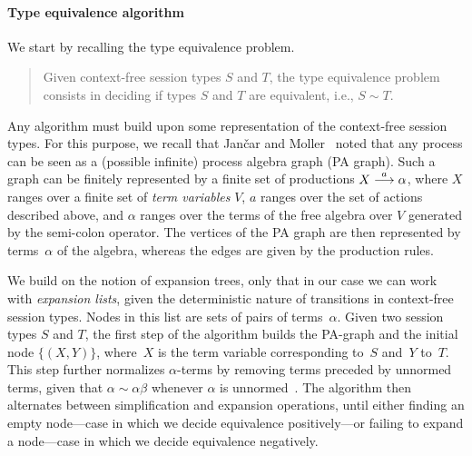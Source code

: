 \paragraph{Type equivalence algorithm}
\label{sec:algorithm}

We start by recalling the type equivalence problem.

\begin{quote}
  Given context-free session types $S$ and $T$, the type equivalence
  problem consists in deciding if types $S$ and $T$ are equivalent,
  i.e., $S\sim T$.
\end{quote}

Any algorithm must build upon some representation of the context-free
session types. For this purpose, we recall that Jan{\v{c}}ar and
Moller~\cite{janvcar1999techniques} noted that any process can be seen
as a (possible infinite) process algebra graph (PA graph).  Such a
graph can be finitely represented by a finite set of productions
$X \stackrel{a}{\longrightarrow} \alpha$, where $X$ ranges over a finite set of
\emph{term variables} $V$, $a$ ranges over the set of actions
described above, and $\alpha$ ranges over the terms of the free
algebra over $V$ generated by the semi-colon operator.
The vertices of the PA graph are then represented by terms~$\alpha$ of
the algebra, whereas the edges are given by the production rules.

We build on the notion of expansion trees, only that in our case we
can work with \emph{expansion lists}, given the deterministic nature
of transitions in context-free session types.
%
Nodes in this list are sets of pairs of terms~$\alpha$.
%
Given two session types $S$ and $T$, the first step of the algorithm
builds the PA-graph and the initial node $\{(X,Y)\}$, where~$X$ is the
term variable corresponding to~$S$ and~$Y$ to~$T$. This step further
normalizes $\alpha$-terms by removing terms preceded by unnormed
terms, given that $\alpha \sim \alpha\beta$ whenever $\alpha$ is
unnormed~\cite{janvcar1999techniques}.
%
The algorithm then alternates between simplification and expansion
operations, until either finding an empty node---case in which we
decide equivalence positively---or failing to expand a node---case in
which we decide equivalence negatively.

